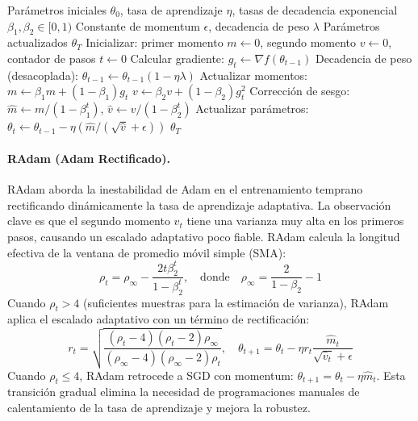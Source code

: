\begin{algorithm}[H]
\caption{AdamW (Adam con Decadencia de Peso Desacoplada)}
\label{alg:adamw}
\begin{algorithmic}[1]
\Require Parámetros iniciales $\theta_0$, tasa de aprendizaje $\eta$, tasas de decadencia exponencial $\beta_1, \beta_2 \in [0,1)$
\Require Constante de momentum $\epsilon$, decadencia de peso $\lambda$
\Ensure Parámetros actualizados $\theta_T$
\State Inicializar: primer momento $m \gets 0$, segundo momento $v \gets 0$, contador de pasos $t \gets 0$
    \State Calcular gradiente: $g_t \gets \nabla f(\theta_{t-1})$
    \State Decadencia de peso (desacoplada): $\theta_{t-1} \gets \theta_{t-1}(1 - \eta\lambda)$
    \State Actualizar momentos: $m \gets \beta_1 m + (1-\beta_1) g_t$
    \State $v \gets \beta_2 v + (1-\beta_2) g_t^2$
    \State Corrección de sesgo: $\hat{m} \gets m / (1 - \beta_1^t)$, $\hat{v} \gets v / (1 - \beta_2^t)$
    \State Actualizar parámetros: $\theta_t \gets \theta_{t-1} - \eta (\hat{m} / (\sqrt{\hat{v}} + \epsilon))$
\EndFor
\Return $\theta_T$
\end{algorithmic}
\end{algorithm}

\paragraph{RAdam (Adam Rectificado).}
RAdam aborda la inestabilidad de Adam en el entrenamiento temprano rectificando dinámicamente la tasa de aprendizaje adaptativa. La observación clave es que el segundo momento $v_t$ tiene una varianza muy alta en los primeros pasos, causando un escalado adaptativo poco fiable. RAdam calcula la longitud efectiva de la ventana de promedio móvil simple (SMA):
\[\rho_t = \rho_{\infty} - \frac{2t\beta_2^t}{1-\beta_2^t}, \quad \text{donde} \quad \rho_{\infty} = \frac{2}{1-\beta_2}-1\]
Cuando $\rho_t > 4$ (suficientes muestras para la estimación de varianza), RAdam aplica el escalado adaptativo con un término de rectificación:
\[r_t = \sqrt{\frac{(\rho_t-4)(\rho_t-2)\rho_{\infty}}{(\rho_{\infty}-4)(\rho_{\infty}-2)\rho_t}}, \quad \theta_{t+1} = \theta_t - \eta r_t \frac{\hat{m}_t}{\sqrt{\hat{v}_t}+\epsilon}\]
Cuando $\rho_t \leq 4$, RAdam retrocede a SGD con momentum: $\theta_{t+1} = \theta_t - \eta\hat{m}_t$. Esta transición gradual elimina la necesidad de programaciones manuales de calentamiento de la tasa de aprendizaje y mejora la robustez.

